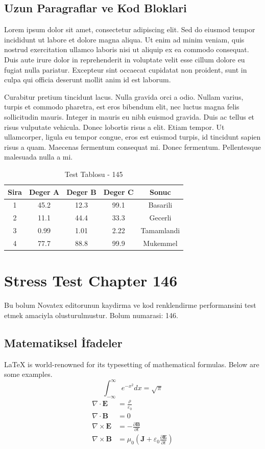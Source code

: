 \documentclass[12pt,a4paper]{article}
\begin{document}
\subsection{Uzun Paragraflar ve Kod Bloklari}
Lorem ipsum dolor sit amet, consectetur adipiscing elit. Sed do eiusmod tempor incididunt ut labore et dolore magna aliqua. Ut enim ad minim veniam, quis nostrud exercitation ullamco laboris nisi ut aliquip ex ea commodo consequat. Duis aute irure dolor in reprehenderit in voluptate velit esse cillum dolore eu fugiat nulla pariatur. Excepteur sint occaecat cupidatat non proident, sunt in culpa qui officia deserunt mollit anim id est laborum.

Curabitur pretium tincidunt lacus. Nulla gravida orci a odio. Nullam varius, turpis et commodo pharetra, est eros bibendum elit, nec luctus magna felis sollicitudin mauris. Integer in mauris eu nibh euismod gravida. Duis ac tellus et risus vulputate vehicula. Donec lobortis risus a elit. Etiam tempor. Ut ullamcorper, ligula eu tempor congue, eros est euismod turpis, id tincidunt sapien risus a quam. Maecenas fermentum consequat mi. Donec fermentum. Pellentesque malesuada nulla a mi.

\begin{table}[h!]
\centering
\begin{tabular}{|c|c|c|c|c|}
\hline
\textbf{Sira} & \textbf{Deger A} & \textbf{Deger B} & \textbf{Deger C} & \textbf{Sonuc} \\
\hline
1 & 45.2 & 12.3 & 99.1 & Basarili \\
2 & 11.1 & 44.4 & 33.3 & Gecerli \\
3 & 0.99 & 1.01 & 2.22 & Tamamlandi \\
4 & 77.7 & 88.8 & 99.9 & Mukemmel \\
\hline
\end{tabular}
\caption{Test Tablosu - 145}
\end{table}

\newpage
\section{Stress Test Chapter 146}
Bu bolum Novatex editorunun kaydirma ve kod renklendirme performansini test etmek amaciyla olusturulmustur. Bolum numarasi: 146.

\subsection{Matematiksel İfadeler}
\LaTeX{} is world-renowned for its typesetting of mathematical formulas. Below are some examples.
\begin{equation}
\int_{-\infty}^{\infty} e^{-x^2} dx = \sqrt{\pi}
\end{equation}
\begin{align}
\nabla \cdot \mathbf{E} &= \frac{\rho}{\varepsilon_0} \\
\nabla \cdot \mathbf{B} &= 0 \\
\nabla \times \mathbf{E} &= -\frac{\partial \mathbf{B}}{\partial t} \\
\nabla \times \mathbf{B} &= \mu_0\left(\mathbf{J} + \varepsilon_0 \frac{\partial \mathbf{E}}{\partial t}\right)
\end{align}
\end{document}
